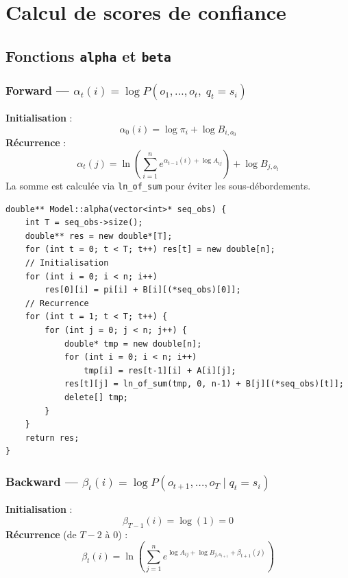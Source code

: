 \documentclass[12pt,a4paper]{article}
\begin{document}
\section{Calcul de scores de confiance}

\subsection{Fonctions \texttt{alpha} et \texttt{beta}}

\subsubsection*{Forward --- $\alpha_t(i) = \log P(o_1, \ldots, o_t,\; q_t = s_i)$}

\begin{formulebox}
\textbf{Initialisation} :
\[
  \alpha_0(i) = \log \pi_i + \log B_{i,o_0}
\]
\textbf{Récurrence} :
\[
  \alpha_t(j) = \ln\!\left(\sum_{i=1}^{n} e^{\alpha_{t-1}(i) + \log A_{ij}}\right) + \log B_{j,o_t}
\]
La somme est calculée via \texttt{ln\_of\_sum} pour éviter les sous-débordements.
\end{formulebox}

\begin{lstlisting}[style=cppstyle, caption={\texttt{alpha} --- \texttt{model.cpp}}]
double** Model::alpha(vector<int>* seq_obs) {
    int T = seq_obs->size();
    double** res = new double*[T];
    for (int t = 0; t < T; t++) res[t] = new double[n];
    // Initialisation
    for (int i = 0; i < n; i++)
        res[0][i] = pi[i] + B[i][(*seq_obs)[0]];
    // Recurrence
    for (int t = 1; t < T; t++) {
        for (int j = 0; j < n; j++) {
            double* tmp = new double[n];
            for (int i = 0; i < n; i++)
                tmp[i] = res[t-1][i] + A[i][j];
            res[t][j] = ln_of_sum(tmp, 0, n-1) + B[j][(*seq_obs)[t]];
            delete[] tmp;
        }
    }
    return res;
}
\end{lstlisting}

\subsubsection*{Backward --- $\beta_t(i) = \log P(o_{t+1}, \ldots, o_T \mid q_t = s_i)$}

\begin{formulebox}
\textbf{Initialisation} :
\[
  \beta_{T-1}(i) = \log(1) = 0
\]
\textbf{Récurrence} (de $T-2$ à $0$) :
\[
  \beta_t(i) = \ln\!\left(\sum_{j=1}^{n} e^{\log A_{ij} + \log B_{j,o_{t+1}} + \beta_{t+1}(j)}\right)
\]
\end{formulebox}
\end{document}

